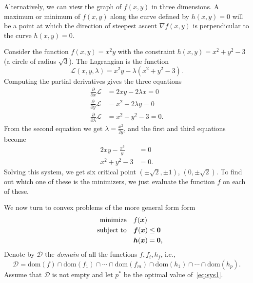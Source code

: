 Alternatively, we can view the graph of $f(x,y)$ in three dimensions. A maximum or minimum of $f(x,y)$ along the curve defined by $h(x,y)=0$ will be a point at which the direction of steepest ascent $\nabla f(x,y)$ is perpendicular to the curve $h(x,y)=0$.

\begin{example}
 Consider the function $f(x,y)=x^2y$ with the constraint $h(x,y)=x^2+y^2-3$ (a circle of radius $\sqrt{3}$). The Lagrangian is the function
 \begin{equation*}
  \mathcal{L}(x,y,\lambda) = x^2y-\lambda(x^2+y^2-3).
 \end{equation*}
Computing the partial derivatives gives the three equations
\begin{align*}
\frac{\partial}{\partial x} \mathcal{L} &= 2xy-2\lambda x = 0\\
\frac{\partial}{\partial y} \mathcal{L} &= x^2-2\lambda y = 0\\
\frac{\partial}{\partial \lambda} \mathcal{L} &= x^2+y^2-3 = 0.
\end{align*}
From the second equation we get $\lambda = \frac{x^2}{2y}$,
and the first and third equations become
\begin{align*}
 2xy-\frac{x^3}{y} &= 0\\
 x^2+y^2-3&=0.
\end{align*}
Solving this system, we get six critical point $(\pm \sqrt{2},\pm 1)$, $(0,\pm \sqrt{2})$. To find out which one of these is the minimizers, we just evaluate the function $f$ on each of these.
\end{example}


We now turn to convex problems of the more general form form
\begin{align}\label{eq:sys1}
\begin{split}
 \text{minimize}\quad & f(\bm{x})\\
 \quad\text{subject to}\quad & \bm{f}(\bm{x})\leq \bm{0}\\
         & \bm{h}(\bm{x})= \bm{0},
\end{split}
\end{align}
Denote by $\mathcal{D}$ the {\em domain} of all the functions $f,f_i,h_j$, i.e., 
\begin{equation*}
 \mathcal{D} = \mathrm{dom}(f)\cap \mathrm{dom}(f_1)\cap\cdots\cap\mathrm{dom}(f_m)\cap \mathrm{dom}(h_1)\cap\cdots \cap \mathrm{dom}(h_p).
\end{equation*}
Assume that $\mathcal{D}$ is not empty and let $p^*$ be the optimal value of~\eqref{eq:sys1}.

